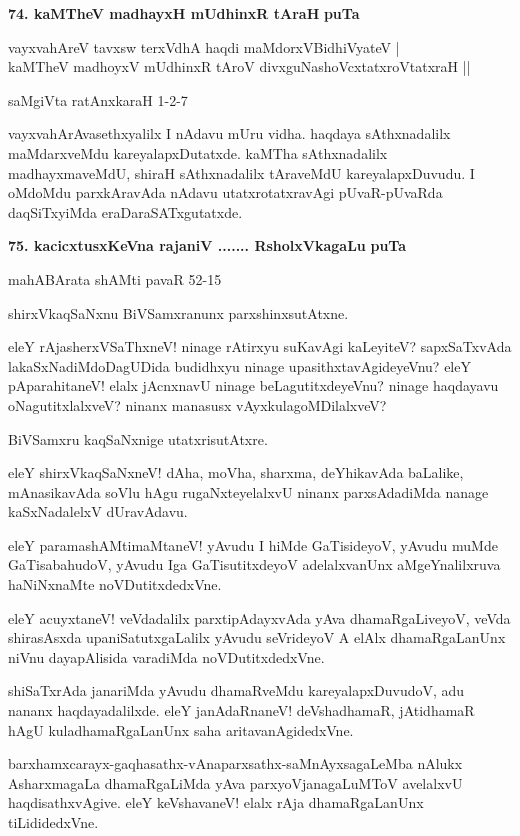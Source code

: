 \eject

\noindent
\textbf{74. kaMTheV madhayxH mUdhinxR tAraH} \hfill{\bf puTa \pageref{153b}}

\begin{shloka}
vayxvahAreV tavxsw terxVdhA haqdi maMdorxVBidhiVyateV |\\
kaMTheV madhoyxV mUdhinxR tAroV divxguNashoVcxtatxroVtatxraH ||
\end{shloka}

\hfill{saMgiVta ratAnxkaraH 1-2-7}

\smallskip
vayxvahArAvasethxyalilx I nAdavu mUru vidha. haqdaya sAthxnadalilx maMdarxveMdu kareyalapxDutatxde. kaMTha sAthxnadalilx madhayxmaveMdU, shiraH sAthxnadalilx tAraveMdU kareyalapxDuvudu. I oMdoMdu parxkAravAda nAdavu utatxrotatxravAgi pUvaR-pUvaRda daqSiTxyiMda eraDaraSATxgutatxde.

\medskip
\noindent
\textbf{75. kacicxtusxKeVna rajaniV ....... RsholxVkagaLu} \hfill{\bf puTa \pageref{162}}

\hfill{mahABArata shAMti pavaR 52-15}

\smallskip
shirxVkaqSaNxnu BiVSamxranunx parxshinxsutAtxne.

eleY rAjasherxVSaThxneV! ninage rAtirxyu suKavAgi kaLeyiteV? sapxSaTxvAda lakaSxNadiMdoDagUDida budidhxyu ninage upasithxtavAgideyeVnu? eleY pAparahitaneV! elalx jAcnxnavU ninage beLagutitxdeyeVnu? ninage haqdayavu oNagutitxlalxveV? ninanx manasusx vAyxkulagoMDilalxveV?

BiVSamxru kaqSaNxnige utatxrisutAtxre.

eleY shirxVkaqSaNxneV! dAha, moVha, sharxma, deYhikavAda baLalike, mAnasikavAda soVlu hAgu rugaNxteyelalxvU ninanx parxsAdadiMda nanage kaSxNadalelxV dUravAdavu.

eleY paramashAMtimaMtaneV! yAvudu I hiMde GaTisideyoV, yAvudu muMde GaTisabahudoV, yAvudu Iga GaTisutitxdeyoV adelalxvanUnx aMgeYnalilxruva haNiNxnaMte noVDutitxdedxVne.

eleY acuyxtaneV! veVdadalilx parxtipAdayxvAda yAva dhamaRgaLiveyoV, veVda shirasAsxda upaniSatutxgaLalilx yAvudu seVrideyoV A elAlx dhamaRgaLanUnx niVnu dayapAlisida varadiMda noVDutitxdedxVne.

shiSaTxrAda janariMda yAvudu dhamaRveMdu kareyalapxDuvudoV, adu nananx haqdayadalilxde. eleY janAdaRnaneV! deVshadhamaR, jAtidhamaR hAgU kuladhamaRgaLanUnx saha aritavanAgidedxVne.

barxhamxcarayx-gaqhasathx-vAnaparxsathx-saMnAyxsagaLeMba nAlukx AsharxmagaLa dhamaRgaLiMda yAva parxyoVjanagaLuMToV avelalxvU haqdisathxvAgive. eleY keVshavaneV! elalx rAja dhamaRgaLanUnx tiLididedxVne.

